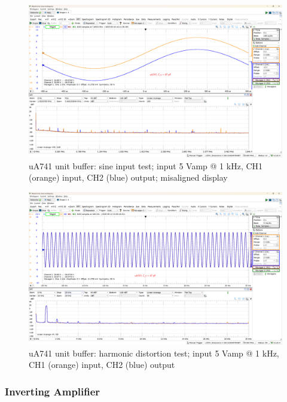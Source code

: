 \documentclass[UTF8]{article}
\begin{document}
\begin{figure}[H]\centering
    \includegraphics[width=\columnwidth]{LCE-06-07-运放设计/assets/uA741/test/unit buffer 2.png}
    \caption{uA741 unit buffer: sine input test; input 5 Vamp @ 1 kHz, CH1 (orange) input, CH2 (blue) output; misaligned display}
\end{figure}


\begin{figure}[H]\centering
    \includegraphics[width=\columnwidth]{LCE-06-07-运放设计/assets/uA741/test/unit buffer 3.png}
    \caption{uA741 unit buffer: harmonic distortion test; input 5 Vamp @ 1 kHz, CH1 (orange) input, CH2 (blue) output}
\end{figure}


\subsubsection{Inverting Amplifier}
\end{document}
